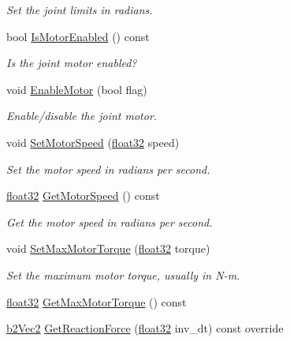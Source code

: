 \begin{DoxyCompactItemize}
\begin{DoxyCompactList}\small\item\em Set the joint limits in radians. \end{DoxyCompactList}\item 
bool \mbox{\hyperlink{classb2_revolute_joint_a37d5744e89991ebe01b974c4d15a21b5}{Is\+Motor\+Enabled}} () const
\begin{DoxyCompactList}\small\item\em Is the joint motor enabled? \end{DoxyCompactList}\item 
void \mbox{\hyperlink{classb2_revolute_joint_a80ed5a07d9a0e07d010808a73ffae6ff}{Enable\+Motor}} (bool flag)
\begin{DoxyCompactList}\small\item\em Enable/disable the joint motor. \end{DoxyCompactList}\item 
void \mbox{\hyperlink{classb2_revolute_joint_a56f60bb1ea69048c8a455da49d62bf65}{Set\+Motor\+Speed}} (\mbox{\hyperlink{b2_settings_8h_aacdc525d6f7bddb3ae95d5c311bd06a1}{float32}} speed)
\begin{DoxyCompactList}\small\item\em Set the motor speed in radians per second. \end{DoxyCompactList}\item 
\mbox{\hyperlink{b2_settings_8h_aacdc525d6f7bddb3ae95d5c311bd06a1}{float32}} \mbox{\hyperlink{classb2_revolute_joint_abb1fa43d5779a1164ddfedf6130d7ff2}{Get\+Motor\+Speed}} () const
\begin{DoxyCompactList}\small\item\em Get the motor speed in radians per second. \end{DoxyCompactList}\item 
void \mbox{\hyperlink{classb2_revolute_joint_a41779d7ec05be33e6368ef00123a3581}{Set\+Max\+Motor\+Torque}} (\mbox{\hyperlink{b2_settings_8h_aacdc525d6f7bddb3ae95d5c311bd06a1}{float32}} torque)
\begin{DoxyCompactList}\small\item\em Set the maximum motor torque, usually in N-\/m. \end{DoxyCompactList}\item 
\mbox{\hyperlink{b2_settings_8h_aacdc525d6f7bddb3ae95d5c311bd06a1}{float32}} \mbox{\hyperlink{classb2_revolute_joint_a878308eb3e299e15ac9dc88d48671d51}{Get\+Max\+Motor\+Torque}} () const
\item 
\mbox{\hyperlink{structb2_vec2}{b2\+Vec2}} \mbox{\hyperlink{classb2_revolute_joint_abeb7bf941589aed0d7f330a578a62024}{Get\+Reaction\+Force}} (\mbox{\hyperlink{b2_settings_8h_aacdc525d6f7bddb3ae95d5c311bd06a1}{float32}} inv\+\_\+dt) const override

\end{DoxyCompactItemize}
